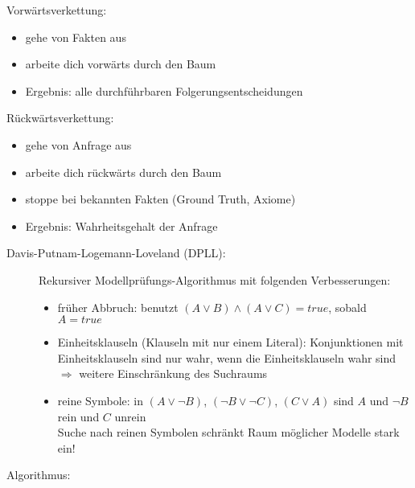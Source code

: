 Vorwärtsverkettung:
\begin{itemize}
\item gehe von Fakten aus
\item arbeite dich vorwärts durch den Baum
\item Ergebnis: alle durchführbaren Folgerungsentscheidungen
\end{itemize}
Rückwärtsverkettung:
\begin{itemize}
\item gehe von Anfrage aus
\item arbeite dich rückwärts durch den Baum
\item stoppe bei bekannten Fakten (Ground Truth, Axiome)
\item Ergebnis: Wahrheitsgehalt der Anfrage
\end{itemize}
\begin{description}
\item[Davis-Putnam-Logemann-Loveland (DPLL):] Rekursiver Modellprüfungs-Algorithmus mit folgenden Verbesserungen:
\begin{itemize}
\item früher Abbruch: benutzt $(A \vee B) \wedge (A \vee C) = true$, sobald $A = true$
\item Einheitsklauseln (Klauseln mit nur einem Literal): Konjunktionen mit Einheitsklauseln sind nur wahr, wenn die Einheitsklauseln wahr sind \\ $\Rightarrow$ weitere Einschränkung des Suchraums
\item reine Symbole: in $(A \vee \neg B)$, $(\neg B \vee \neg C)$, $(C \vee A)$ sind $A$ und $\neg B$ rein und $C$ unrein \\ Suche nach reinen Symbolen schränkt Raum möglicher Modelle stark ein!
\end{itemize}
\end{description}
Algorithmus:

